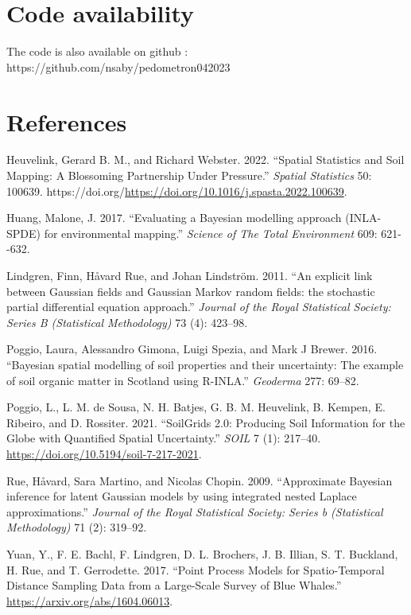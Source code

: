 \documentclass[
  a4paper,
]{article}
\newlength{\cslhangindent}
\newlength{\cslentryspacingunit} %
\newenvironment{CSLReferences}[2] %
 {%
  \setlength{\parindent}{0pt}
  \ifodd #1
  \let\oldpar\par
  \def\par{\hangindent=\cslhangindent\oldpar}
  \fi
  \setlength{\parskip}{#2\cslentryspacingunit}
 }%
 {}
\begin{document}
\hypertarget{code-availability}{%
\section{Code availability}\label{code-availability}}

The code is also available on github :
https://github.com/nsaby/pedometron042023

\hypertarget{references}{%
\section{References}\label{references}}

\hypertarget{refs}{}
\begin{CSLReferences}{1}{0}
\leavevmode{}%
Heuvelink, Gerard B. M., and Richard Webster. 2022. {``Spatial
Statistics and Soil Mapping: A Blossoming Partnership Under Pressure.''}
\emph{Spatial Statistics} 50: 100639.
https://doi.org/\url{https://doi.org/10.1016/j.spasta.2022.100639}.

\leavevmode{}%
Huang, Malone, J. 2017. {``{Evaluating a Bayesian modelling approach
(INLA-SPDE) for environmental mapping}.''} \emph{Science of The Total
Environment} 609: 621-\/-632.

\leavevmode{}%
Lindgren, Finn, Håvard Rue, and Johan Lindström. 2011. {``{An explicit
link between Gaussian fields and Gaussian Markov random fields: the
stochastic partial differential equation approach}.''} \emph{Journal of
the Royal Statistical Society: Series B (Statistical Methodology)} 73
(4): 423--98.

\leavevmode{}%
Poggio, Laura, Alessandro Gimona, Luigi Spezia, and Mark J Brewer. 2016.
{``{Bayesian spatial modelling of soil properties and their uncertainty:
The example of soil organic matter in Scotland using R-INLA}.''}
\emph{Geoderma} 277: 69--82.

\leavevmode{}%
Poggio, L., L. M. de Sousa, N. H. Batjes, G. B. M. Heuvelink, B. Kempen,
E. Ribeiro, and D. Rossiter. 2021. {``{SoilGrids} 2.0: Producing Soil
Information for the Globe with Quantified Spatial Uncertainty.''}
\emph{SOIL} 7 (1): 217--40.
\url{https://doi.org/10.5194/soil-7-217-2021}.

\leavevmode{}%
Rue, Håvard, Sara Martino, and Nicolas Chopin. 2009. {``{Approximate
Bayesian inference for latent Gaussian models by using integrated nested
Laplace approximations}.''} \emph{Journal of the Royal Statistical
Society: Series b (Statistical Methodology)} 71 (2): 319--92.

\leavevmode{}%
Yuan, Y., F. E. Bachl, F. Lindgren, D. L. Brochers, J. B. Illian, S. T.
Buckland, H. Rue, and T. Gerrodette. 2017. {``Point Process Models for
Spatio-Temporal Distance Sampling Data from a Large-Scale Survey of Blue
Whales.''} \url{https://arxiv.org/abs/1604.06013}.

\end{CSLReferences}
\end{document}
